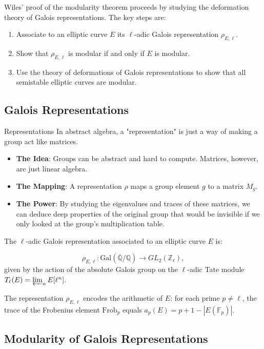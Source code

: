Wiles' proof of the modularity theorem proceeds by studying the deformation theory of Galois representations. The key steps are:

\begin{enumerate}
\item Associate to an elliptic curve $E$ its $\ell$-adic Galois representation $\rho_{E,\ell}$.
\item Show that $\rho_{E,\ell}$ is modular if and only if $E$ is modular.
\item Use the theory of deformations of Galois representations to show that all semistable elliptic curves are modular.
\end{enumerate}

\subsection{Galois Representations}

\begin{knowledgebridge}{Representations}
In abstract algebra, a "representation" is just a way of making a group act like matrices.
\begin{itemize}
    \item \textbf{The Idea}: Groups can be abstract and hard to compute. Matrices, however, are just linear algebra.
    \item \textbf{The Mapping}: A representation $\rho$ maps a group element $g$ to a matrix $M_g$.
    \item \textbf{The Power}: By studying the eigenvalues and traces of these matrices, we can deduce deep properties of the original group that would be invisible if we only looked at the group's multiplication table.
\end{itemize}
\end{knowledgebridge}

The $\ell$-adic Galois representation associated to an elliptic curve $E$ is:

\[
\rho_{E,\ell}: \mathrm{Gal}(\overline{\mathbb{Q}}/\mathbb{Q}) \to GL_2(\mathbb{Z}_\ell),
\]
given by the action of the absolute Galois group on the $\ell$-adic Tate module $T_\ell(E) = \varprojlim_n E[\ell^n]$.

The representation $\rho_{E,\ell}$ encodes the arithmetic of $E$: for each prime $p \neq \ell$, the trace of the Frobenius element $\mathrm{Frob}_p$ equals $a_p(E) = p + 1 - |E(\mathbb{F}_p)|$.

\subsection{Modularity of Galois Representations}

